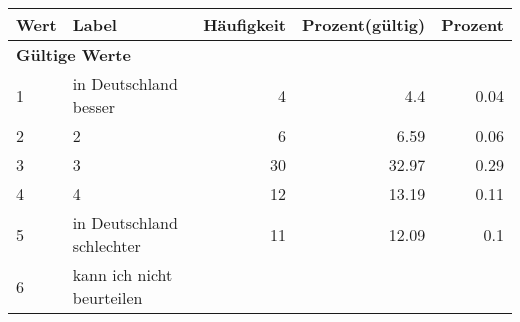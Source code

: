      \begin{longtable}{lXrrr}
     \toprule
     \textbf{Wert} & \textbf{Label} & \textbf{Häufigkeit} & \textbf{Prozent(gültig)} & \textbf{Prozent} \\
     \endhead
     \midrule
     \multicolumn{5}{l}{\textbf{Gültige Werte}}\\

     1 &
     \multicolumn{1}{X}{ in Deutschland besser   } &


       \num{4} &
       \num[round-mode=places,round-precision=2]{4,4} &
         \num[round-mode=places,round-precision=2]{0,04} \\

     2 &
     \multicolumn{1}{X}{ 2   } &


       \num{6} &
       \num[round-mode=places,round-precision=2]{6,59} &
         \num[round-mode=places,round-precision=2]{0,06} \\

     3 &
     \multicolumn{1}{X}{ 3   } &


       \num{30} &
       \num[round-mode=places,round-precision=2]{32,97} &
         \num[round-mode=places,round-precision=2]{0,29} \\

     4 &
     \multicolumn{1}{X}{ 4   } &


       \num{12} &
       \num[round-mode=places,round-precision=2]{13,19} &
         \num[round-mode=places,round-precision=2]{0,11} \\

     5 &
     \multicolumn{1}{X}{ in Deutschland schlechter   } &


       \num{11} &
       \num[round-mode=places,round-precision=2]{12,09} &
         \num[round-mode=places,round-precision=2]{0,1} \\

     6 &
     \multicolumn{1}{X}{ kann ich nicht beurteilen   } &



\end{longtable}
